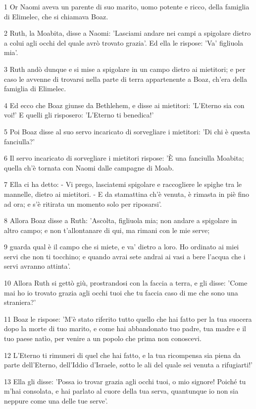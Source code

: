 \par 1 Or Naomi aveva un parente di suo marito, uomo potente e ricco, della famiglia di Elimelec, che si chiamava Boaz.
\par 2 Ruth, la Moabita, disse a Naomi: 'Lasciami andare nei campi a spigolare dietro a colui agli occhi del quale avrò trovato grazia'. Ed ella le rispose: 'Va' figliuola mia'.
\par 3 Ruth andò dunque e si mise a spigolare in un campo dietro ai mietitori; e per caso le avvenne di trovarsi nella parte di terra appartenente a Boaz, ch'era della famiglia di Elimelec.
\par 4 Ed ecco che Boaz giunse da Bethlehem, e disse ai mietitori: 'L'Eterno sia con voi!' E quelli gli risposero: 'L'Eterno ti benedica!'
\par 5 Poi Boaz disse al suo servo incaricato di sorvegliare i mietitori: 'Di chi è questa fanciulla?'
\par 6 Il servo incaricato di sorvegliare i mietitori rispose: 'È una fanciulla Moabita; quella ch'è tornata con Naomi dalle campagne di Moab.
\par 7 Ella ci ha detto: - Vi prego, lasciatemi spigolare e raccogliere le spighe tra le mannelle, dietro ai mietitori. - E da stamattina ch'è venuta, è rimasta in piè fino ad ora; e s'è ritirata un momento solo per riposarsi'.
\par 8 Allora Boaz disse a Ruth: 'Ascolta, figliuola mia; non andare a spigolare in altro campo; e non t'allontanare di qui, ma rimani con le mie serve;
\par 9 guarda qual è il campo che si miete, e va' dietro a loro. Ho ordinato ai miei servi che non ti tocchino; e quando avrai sete andrai ai vasi a bere l'acqua che i servi avranno attinta'.
\par 10 Allora Ruth si gettò giù, prostrandosi con la faccia a terra, e gli disse: 'Come mai ho io trovato grazia agli occhi tuoi che tu faccia caso di me che sono una straniera?'
\par 11 Boaz le rispose: 'M'è stato riferito tutto quello che hai fatto per la tua suocera dopo la morte di tuo marito, e come hai abbandonato tuo padre, tua madre e il tuo paese natìo, per venire a un popolo che prima non conoscevi.
\par 12 L'Eterno ti rimuneri di quel che hai fatto, e la tua ricompensa sia piena da parte dell'Eterno, dell'Iddio d'Israele, sotto le ali del quale sei venuta a rifugiarti!'
\par 13 Ella gli disse: 'Possa io trovar grazia agli occhi tuoi, o mio signore! Poiché tu m'hai consolata, e hai parlato al cuore della tua serva, quantunque io non sia neppure come una delle tue serve'.
